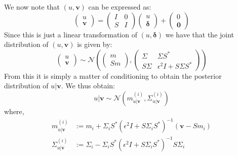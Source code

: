 We now note that $(u,\mathbf{v})$ can be expressed as:
\begin{equation*}
  \begin{pmatrix}
    u \\
    \mathbf{v}
  \end{pmatrix}=\begin{pmatrix}
                  I & 0 \\
                  S & I
                \end{pmatrix}\begin{pmatrix}
                              u \\
                              \boldsymbol{\delta}
                             \end{pmatrix} +
                             \begin{pmatrix}
                                0 \\ \mathbf{0}
                             \end{pmatrix}
\end{equation*}
Since this is just a linear transformation of $(u,\boldsymbol{\delta})$ we have that the joint distribution of $(u,\mathbf{v})$ is given by:
\begin{equation}
  \label{jointDist}
  \begin{pmatrix}
    u \\
    \mathbf{v}
  \end{pmatrix}\sim\mathcal{N}\left(
                              \begin{pmatrix}
                                m \\
                                Sm
                              \end{pmatrix},
                              \begin{pmatrix}
                                \Sigma & \Sigma S^{*} \\
                                S\Sigma & \epsilon^{2}I+S\Sigma S^{*}
                              \end{pmatrix}
                              \right)
\end{equation}
From this it is simply a matter of conditioning to obtain the posterior distribution of $u|\mathbf{v}$. We thus obtain:
\begin{equation}
  \label{posterior}
  u|\mathbf{v}\sim\mathcal{N}(m^{(i)}_{u|\mathbf{v}},\Sigma^{(i)}_{u|\mathbf{v}})
\end{equation}
where,
\begin{align}
  \label{posterior_mean}
  m^{(i)}_{u|\mathbf{v}}&:=m_i+\Sigma_{i}S^{*}(\epsilon^{2}I+S\Sigma_{i}S^{*})^{-1}(\mathbf{v}-Sm_{i}) \\
  \label{posterior_covariance}
  \Sigma^{(i)}_{u|\mathbf{v}}&:=\Sigma_{i}-\Sigma_{i}S^{*}(\epsilon^{2}I+S\Sigma_{i}S^{*})^{-1}S\Sigma_{i}
\end{align}

